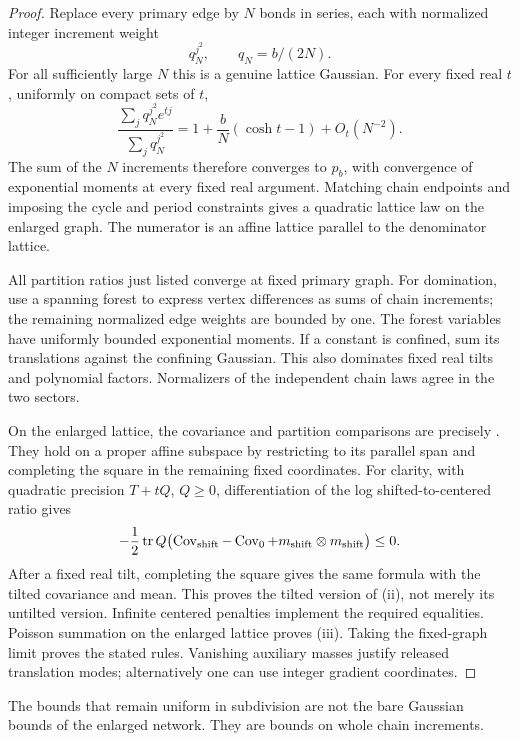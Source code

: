 \begin{proof}
Replace every primary edge by \(N\) bonds in series, each with
normalized integer increment weight
\[
 q_N^{j^2},\qquad q_N=b/(2N).
\]
For all sufficiently large \(N\) this is a genuine lattice Gaussian.
For every fixed real \(t\), uniformly on compact sets of \(t\),
\[
 \frac{\sum_jq_N^{j^2}e^{tj}}{\sum_jq_N^{j^2}}
 =1+\frac bN(\cosh t-1)+O_t(N^{-2}).
\]
The sum of the \(N\) increments therefore converges to \(p_b\),
with convergence of exponential moments at every fixed real
argument. Matching chain endpoints and imposing the cycle and
period constraints gives a quadratic lattice law on the enlarged
graph. The numerator is an affine lattice parallel to the
denominator lattice.

All partition ratios just listed converge at fixed primary graph.
For domination, use a spanning forest to express vertex differences
as sums of chain increments; the remaining normalized edge weights
are bounded by one. The forest variables have uniformly bounded
exponential moments. If a constant is confined, sum its translations
against the confining Gaussian. This also dominates fixed real
tilts and polynomial factors. Normalizers of the independent chain
laws agree in the two sectors.

On the enlarged lattice, the covariance and partition comparisons
are precisely . They hold on a proper
affine subspace by restricting to its parallel span and completing
the square in the remaining fixed coordinates. For clarity, with
quadratic precision \(T+tQ\), \(Q\ge0\), differentiation of the log
shifted-to-centered ratio gives
\[
 -\frac12\operatorname{tr} Q\bigl(
       \operatorname{Cov}_{\mathrm{shift}}-\operatorname{Cov}_0
       +m_{\mathrm{shift}}\otimes m_{\mathrm{shift}}\bigr)\le0.
\]
After a fixed real tilt, completing the square gives the same
formula with the tilted covariance and mean. This proves the
tilted version of (ii), not merely its untilted version.
Infinite centered penalties implement the required equalities.
Poisson summation on the enlarged lattice proves (iii).
Taking the fixed-graph limit proves the stated rules.
Vanishing auxiliary masses justify released translation modes;
alternatively one can use integer gradient coordinates.
\end{proof}

The bounds that remain uniform in subdivision are not the bare
Gaussian bounds of the enlarged network. They are bounds on whole
chain increments.

